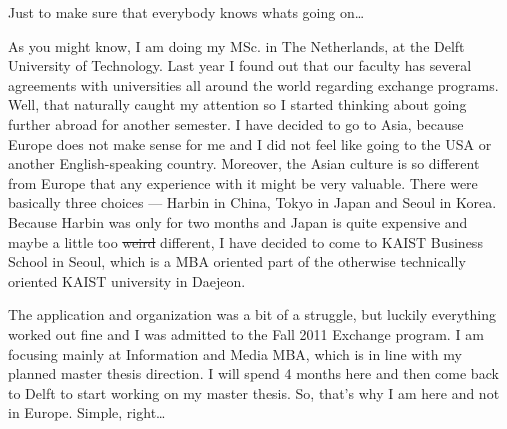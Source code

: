 \begin{post}
	\begin{content}
Just to make sure that everybody knows whats going on\ldots

As you might know, I am doing my MSc. in The Netherlands, at the Delft University of Technology. Last year I found out that our faculty has several agreements with universities all around the world regarding exchange programs. Well, that naturally caught my attention so I started thinking about going further abroad for another semester. I have decided to go to Asia, because Europe does not make sense for me and I did not feel like going to the USA or another English-speaking country. Moreover, the Asian culture is so different from Europe that any experience with it might be very valuable. There were basically three choices --- Harbin in China, Tokyo in Japan and Seoul in Korea. Because Harbin was only for two months and Japan is quite expensive and maybe a little too \sout{weird} different, I have decided to come to KAIST Business School in Seoul, which is a MBA oriented part of the otherwise technically oriented KAIST university in Daejeon.

The application and organization was a bit of a struggle, but luckily everything worked out fine and I was admitted to the Fall 2011 Exchange program. I am focusing mainly at Information and Media MBA, which is in line with my planned master thesis direction. I will spend 4 months here and then come back to Delft to start working on my master thesis. So, that's why I am here and not in Europe. Simple, right\ldots
	\end{content}
\end{post}
